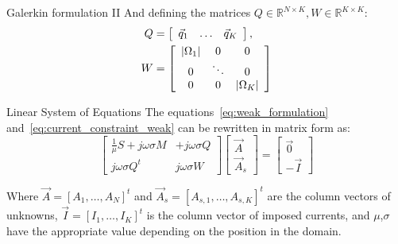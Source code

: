 \documentclass[aspectratio=54,xcolor=dvipsnames]{beamer}
\begin{document}
\begin{frame}{Galerkin formulation II}
    And defining the matrices $Q \in \mathbb{R}^{N \times K}, W \in \mathbb{R}^{K \times K}$:
    \begin{align*}
        Q &= \left[
        \begin{array}{ccc}
            \vec{q}_1 & \ldots & \vec{q}_K 
        \end{array}
        \right], \\
        W &= \left[
        \begin{array}{ccc}
            \abs{\Omega_1} & 0 & 0 \\
            0 & \ddots & 0 \\
            0 & 0 & \abs{\Omega_K}
        \end{array}
        \right]
    \end{align*}

    \begin{block}{Linear System of Equations}
    The equations~\eqref{eq:weak_formulation} and~\eqref{eq:current_constraint_weak} can be rewritten in matrix form as:
    \begin{equation}
        \left[
        \begin{array}{cc}
            \frac{1}{\mu} S + j\omega \sigma M & +j\omega \sigma Q\\
            j\omega \sigma Q^t & j\omega \sigma W 
        \end{array}
        \right]
        \left[
        \begin{array}{c}
            \vec{A} \\
            \vec{A}_{s}
        \end{array}
        \right]
        =
        \left[
        \begin{array}{c}
            \vec{0} \\
            -\vec{I} 
        \end{array}
        \right]
    \end{equation}
    \end{block}
    Where $\vec{A} = [A_1, \ldots, A_N]^t$ and $\vec{A}_s = [A_{s,1}, \ldots, A_{s,K}]^t$ are the column vectors of unknowns, $\vec{I} = [I_1, \ldots, I_K]^t$ is the column vector of imposed currents, and $\mu$,$\sigma$ have the appropriate value depending on the position in the domain.
\end{frame}
\end{document}
